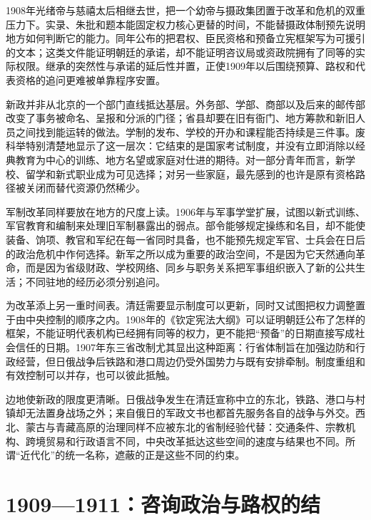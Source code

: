 1908年光绪帝与慈禧太后相继去世，把一个幼帝与摄政集团置于改革和危机的双重压力下。实录、朱批和题本能固定权力核心更替的时间，不能替摄政体制预先说明地方如何判断它的能力。同年公布的把君权、臣民资格和预备立宪框架写为可援引的文本；这类文件能证明朝廷的承诺，却不能证明咨议局或资政院拥有了同等的实际权限。继承的突然性与承诺的延后性并置，正使1909年以后围绕预算、路权和代表资格的追问更难被单靠程序安置。

新政并非从北京的一个部门直线抵达基层。外务部、学部、商部以及后来的邮传部改变了事务被命名、呈报和分派的门径；省县却要在旧有衙门、地方筹款和新旧人员之间找到能运转的做法。学制的发布、学校的开办和课程能否持续是三件事。废科举特别清楚地显示了这一层次：它结束的是国家考试制度，并没有立即消除以经典教育为中心的训练、地方名望或家庭对仕进的期待。对一部分青年而言，新学校、留学和新式职业成为可见选择；对另一些家庭，最先感到的也许是原有资格路径被关闭而替代资源仍然稀少。

军制改革同样要放在地方的尺度上读。1906年与军事学堂扩展，试图以新式训练、军官教育和编制来处理旧军制暴露出的弱点。部令能够规定操练和名目，却不能使装备、饷项、教官和军纪在每一省同时具备，也不能预先规定军官、士兵会在日后的政治危机中作何选择。新军之所以成为重要的政治空间，不是因为它天然通向革命，而是因为省级财政、学校网络、同乡与职务关系把军事组织嵌入了新的公共生活；不同驻地的经历必须分别追问。

为改革添上另一重时间表。清廷需要显示制度可以更新，同时又试图把权力调整置于由中央控制的顺序之内。1908年的《钦定宪法大纲》可以证明朝廷公布了怎样的框架，不能证明代表机构已经拥有同等的权力，更不能把“预备”的日期直接写成社会信任的日期。1907年东三省改制尤其显出这种距离：行省体制旨在加强边防和行政经营，但日俄战争后铁路和港口周边仍受外国势力与既有安排牵制。制度重组和有效控制可以并存，也可以彼此抵触。

边地使新政的限度更清晰。日俄战争发生在清廷宣称中立的东北，铁路、港口与村镇却无法置身战场之外；来自俄日的军政文书也都首先服务各自的战争与外交。西北、蒙古与青藏高原的治理同样不应被东北的省制经验代替：交通条件、宗教机构、跨境贸易和行政语言不同，中央改革抵达这些空间的速度与结果也不同。所谓“近代化”的统一名称，遮蔽的正是这些不同的约束。

\section{1909—1911：咨询政治与路权的结}

